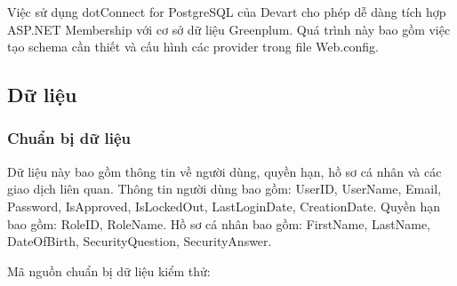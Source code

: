\documentclass{article}[14pt]
\begin{document}
Việc sử dụng dotConnect for PostgreSQL của Devart cho phép dễ dàng tích hợp ASP.NET Membership với cơ sở dữ liệu Greenplum. Quá trình này bao gồm việc tạo schema cần thiết và cấu hình các provider trong file Web.config.


\subsection{Dữ liệu}

\subsubsection{Chuẩn bị dữ liệu}

Dữ liệu này bao gồm thông tin về người dùng, quyền hạn, hồ sơ cá nhân và các giao dịch liên quan. Thông tin người dùng bao gồm: UserID, UserName, Email, Password, IsApproved, IsLockedOut, LastLoginDate, CreationDate. Quyền hạn bao gồm: RoleID, RoleName. Hồ sơ cá nhân bao gồm: FirstName, LastName, DateOfBirth, SecurityQuestion, SecurityAnswer.

Mã nguồn chuẩn bị dữ liệu kiểm thử:
\end{document}
